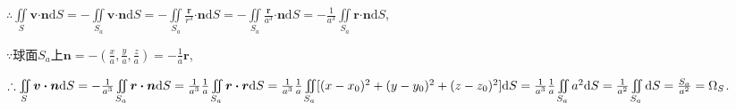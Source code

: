 \documentclass[12pt,UTF8]{ctexart}
\newcommand{\md}[1]{\mathrm d#1}
\newcommand{\BSIInt}[2]{\iint\limits_{#1}#2}
\begin{document}
\begin{enumerate}
$\therefore\BSIInt S{\bm v\bm\cdot\bm n\md S}=-\BSIInt{S_a}{\bm v\bm\cdot\bm n\md S}=-\BSIInt{S_a}{\frac{\bm r}{r^3}\bm\cdot\bm n\md S}=-\BSIInt{S_a}{\frac{\bm r}{a^3}\bm\cdot\bm n\md S}=-\frac1{a^3}\BSIInt{S_a}{\bm r\bm\cdot\bm n\md S}$,

$\because$球面$S_a$上$\bm n=-(\frac xa,\frac ya,\frac za)=-\frac1a\bm r$,

$\therefore\BSIInt S{\bm v\bm\cdot\bm n\md S}=-\frac1{a^3}\BSIInt{S_a}{\bm r\bm\cdot\bm n\md S}=\frac1{a^3}\frac1a\BSIInt{S_a}{\bm r\bm\cdot\bm r\md S}=\frac1{a^3}\frac1a\BSIInt{S_a}{[(x-x_0)^2+(y-y_0)^2+(z-z_0)^2]\md S}\\
=\frac1{a^3}\frac1a\BSIInt{S_a}{a^2\md S}=\frac1{a^2}\BSIInt{S_a}{\md S}=\frac{S_a}{a^2}=\Omega_S$.
\end{enumerate}
\end{document}
